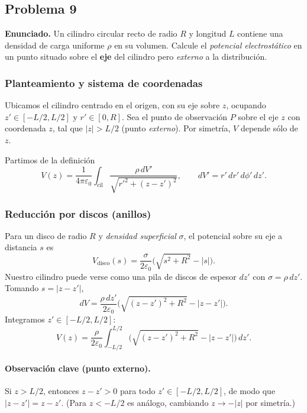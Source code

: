 \documentclass{article}
\begin{document}
\subsection{Problema 9} \vspace{0.5cm}

\textbf{Enunciado.} Un cilindro circular recto de radio $R$ y longitud $L$ contiene una densidad de carga uniforme $\rho$ en su volumen. Calcule el \emph{potencial electrostático} en un punto situado sobre el \textbf{eje} del cilindro pero \emph{externo} a la distribución.

\subsubsection*{Planteamiento y sistema de coordenadas}
Ubicamos el cilindro centrado en el origen, con su eje sobre $z$, ocupando $z'\in[-L/2,L/2]$ y $r'\in[0,R]$.  
Sea el punto de observación $P$ sobre el eje $z$ con coordenada $z$, tal que $\boxed{|z|>L/2}$ (punto \emph{externo}). Por simetría, $V$ depende sólo de $z$.

Partimos de la definición
\[
V(z)=\frac{1}{4\pi\varepsilon_0}\int_{\text{cil}}\frac{\rho\,dV'}{\sqrt{r'^2+(z-z')^2}},
\qquad dV'=r'\,dr'\,d\phi'\,dz'.
\]

\subsubsection*{Reducción por discos (anillos)}
Para un disco de radio $R$ y \emph{densidad superficial} $\sigma$, el potencial sobre su eje a distancia $s$ es
\[
V_{\text{disco}}(s)=\frac{\sigma}{2\varepsilon_0}\Big(\sqrt{s^2+R^2}-|s|\Big).
\]
Nuestro cilindro puede verse como una pila de discos de espesor $dz'$ con $\sigma=\rho\,dz'$. Tomando $s=|z-z'|$,
\[
dV=\frac{\rho\,dz'}{2\varepsilon_0}\Big(\sqrt{(z-z')^2+R^2}-|z-z'|\Big).
\]
Integramos $z'\in[-L/2,L/2]$:
\begin{equation}\label{eq:V-general}
V(z)=\frac{\rho}{2\varepsilon_0}\int_{-L/2}^{L/2}
\Big(\sqrt{(z-z')^2+R^2}-|z-z'|\Big)\,dz'.
\end{equation}

\paragraph{Observación clave (punto externo).}
Si $z>L/2$, entonces $z-z'>0$ para todo $z'\in[-L/2,L/2]$, de modo que $|z-z'|=z-z'$.  
(Para $z<-L/2$ es análogo, cambiando $z\to -|z|$ por simetría.)
\end{document}
